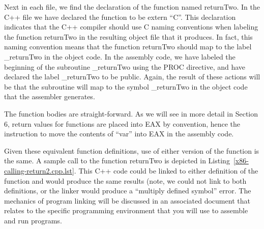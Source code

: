 Next in each file, we find the declaration of the function named
returnTwo. In the C++ file we have declared the function to be extern
``C''. This declaration indicates that the C++ compiler should use C
naming conventions when labeling the function returnTwo in the
resulting object file that it produces. In fact, this naming
convention means that the function returnTwo should map to the label
\_returnTwo in the object code. In the assembly code, we have labeled
the beginning of the subroutine \_returnTwo using the PROC directive,
and have declared the label \_returnTwo to be public. Again, the
result of these actions will be that the subroutine will map to the
symbol \_returnTwo in the object code that the assembler generates.

The function bodies are straight-forward. As we will see in more
detail in Section 6, return values for functions are placed into EAX
by convention, hence the instruction to move the contents of ``var''
into EAX in the assembly code.

\begin{figure}

\vspace{-0.25in}
\end{figure}

Given these equivalent function definitions, use of either version of
the function is the same.  A sample call to the function returnTwo is
depicted in Listing~\ref{x86-calling-return2.cpp.lst}. This C++ code
could be linked to either definition of the function and would produce
the same results (note, we could not link to both definitions, or the
linker would produce a ``multiply defined symbol'' error. The
mechanics of program linking will be discussed in an associated
document that relates to the specific programming environment that you
will use to assemble and run programs.
